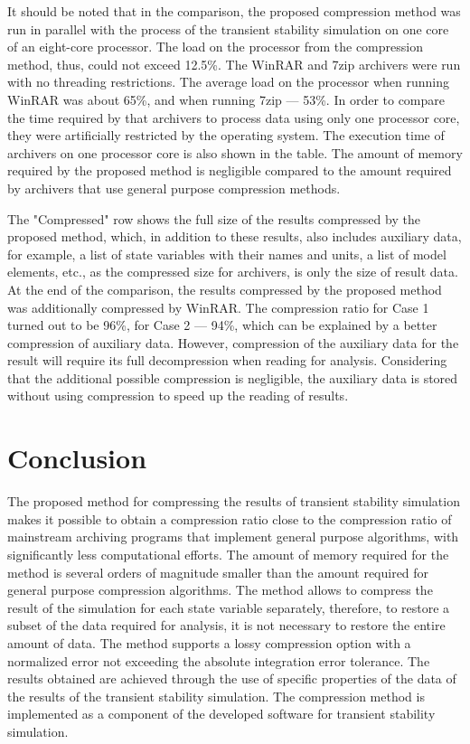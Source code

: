 \documentclass[lettersize,journal]{IEEEtran}
\begin{document}
It should be noted that in the comparison, the proposed compression method was run in parallel with the process 
of  the transient stability simulation on one core of an eight-core processor. 
The load on the processor from the compression method, thus, could not exceed 12.5\%. 
The WinRAR and 7zip archivers were run with no threading restrictions. 
The average load on the processor when running WinRAR was about 65\%, and when running 7zip --- 53\%. 
In order to compare the time required by that archivers to process data using only one processor core, they 
were artificially restricted by the operating system. The execution time of archivers on one 
processor core is also shown in the table. The amount of memory required by the proposed method is negligible 
compared to the amount required by archivers that use general purpose compression methods.

The "Compressed" row shows the full size of the results compressed by the proposed method, which, 
in addition to these results, also includes auxiliary data, for example, a list of state 
variables with their names and units, a list of model elements, etc., as the compressed size for archivers, 
is only the size of result data. At the end of the comparison, the results compressed 
by the proposed method was additionally compressed by WinRAR. The compression ratio for Case 1 turned out 
to be 96\%, for Case 2 --- 94\%, which can be explained by a better compression of auxiliary data. 
However, compression of the auxiliary data for the result will require 
its full decompression when reading for analysis. Considering that the additional possible compression is negligible, the auxiliary data is stored without using compression to speed up the reading of results.

\section{Conclusion}
The proposed method for compressing the results of transient stability simulation makes it possible to obtain a compression ratio 
close to the compression ratio of mainstream archiving programs that implement general purpose algorithms, with significantly 
less computational efforts. The amount of memory required for the method is several orders of magnitude smaller than the amount 
required for general purpose compression algorithms. The method allows to compress the result of the simulation for each 
state variable separately, therefore, to restore a subset of the data required for analysis, it is not necessary to restore 
the entire amount of data. The method supports a lossy compression option with a normalized error not exceeding the absolute 
integration error tolerance. The results obtained are achieved through the use of specific properties of the data of the results of the 
transient stability simulation. The compression method is implemented as a component of the developed software for 
transient stability simulation.
\end{document}
